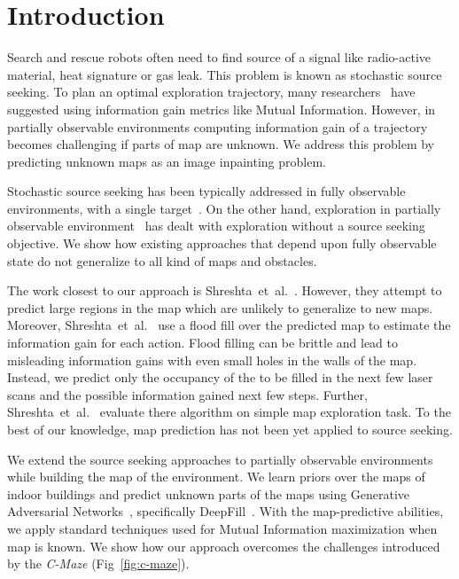 \section{Introduction}\label{sec:intro}

Search and rescue robots often need to find source of a signal like radio-active material, heat signature or gas leak. 
This problem is known as stochastic source seeking.
To plan an optimal exploration trajectory, many researchers~\cite{atanasov2014StochasticSourceSeeking} have suggested using 
information gain metrics like Mutual Information.
However, in partially observable environments computing information gain of 
a trajectory becomes challenging if parts of map are unknown. 
We address this problem by predicting unknown maps as an image inpainting problem.

Stochastic source seeking has been typically addressed in fully
   observable environments, with a single target~\cite{atanasov2014StochasticSourceSeeking}.
   On the other hand, exploration in partially observable
   environment~\cite{choudhury2017adaptive} has dealt
   with exploration without a source seeking objective.
We show how existing approaches that depend upon fully observable state do
not generalize to all kind of maps and obstacles. 

The work closest to our approach is Shreshta~et~al.~\cite{shreshta2019icra}.
However, they attempt to predict large regions in the map which are unlikely to generalize to new maps.
Moreover, Shreshta~et~al.~\cite{shreshta2019icra} use a flood fill over the
predicted map to estimate the information gain for each action. 
Flood filling can be brittle and lead to misleading information gains with even small holes in the walls of the map.
Instead, we predict only the occupancy of the to be filled in the next few laser scans and the possible information gained next few steps.
Further, Shreshta~et~al.~\cite{shreshta2019icra} evaluate there algorithm on simple map exploration task. 
To the best of our knowledge, map prediction has not been yet applied to source seeking.

We extend the source seeking approaches to partially observable environments
while building the map of the environment. We learn priors over the maps of
indoor buildings and predict unknown parts of the maps using Generative
Adversarial Networks~\cite{goodfellow2014GAN}, specifically
DeepFill~\cite{yu2018DeepFill}. With the map-predictive abilities, we apply
standard techniques used for Mutual Information maximization when map is known.
We show how our approach overcomes the challenges introduced by the
\emph{C-Maze} (Fig~\ref{fig:c-maze}).

